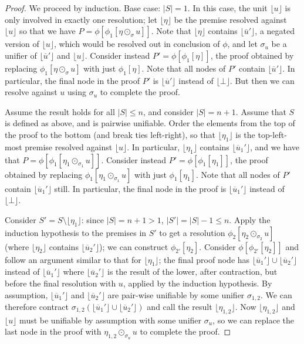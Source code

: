 \documentclass[12pt]{article}
\theoremstyle{definition}
\theoremstyle{remark}
\newcommand{\clause}[1]{ \lfloor{#1} \rfloor}
\begin{document}
\begin{proof}
We proceed by induction. Base case: $|S|=1$. In this case, the unit $\clause{u}$ is only involved in exactly one resolution; let $\clause{\eta}$ be the premise resolved against $\clause{u}$ so that we have $P=\phi[\phi_1[\eta \odot_{\sigma} u]]$. Note that $\clause{\eta}$ contains $\clause{\overline{u}'}$, a negated version of $\clause{u}$, which would be resolved out in conclusion of $\phi$, and let $\sigma_u$ be a unifier of $\clause{\overline{u}'}$ and $\clause{u}$. Consider instead $P'=\phi[\phi_1[\eta]]$, the proof obtained by replacing $\phi_1[\eta \odot_{\sigma} u]$ with just $\phi_1[\eta]$. Note that all nodes of $P'$ contain $\clause{\overline{u}'}$. In particular, the final node in the proof $P'$ is $\clause{\overline{u}'}$ instead of $\clause{\bot}$. But then we can resolve against $u$ using $\sigma_u$ to complete the proof.

Assume the result holds for all $|S|\le n$, and consider $|S|=n+1$. Assume that $S$ is defined as above, and is pairwise unifiable. Order the elements from the top of the proof to the bottom (and break ties left-right), so that $\clause{\eta_1}$ is the top-left-most premise resolved against $\clause{u}$. In particular, $\clause{\eta_1}$ contains $\clause{\overline{u}_1'}$, and we have that $P=\phi[\phi_1[\eta_1 \odot_{\sigma_1} u]]$. Consider instead $P'=\phi[\phi_{1}[\eta_1]]$, the proof obtained by replacing $\phi_1[\eta_1 \odot_{\sigma_1} u]$ with just $\phi_{1}[\eta_1]$. Note that all nodes of $P'$ contain $\clause{\overline{u}_1'}$ still. In particular, the final node in the proof is $\clause{\overline{u}_1'}$ instead of $\clause{\bot}$.  

Consider $S'=S\setminus\clause{\eta_1}$: since $|S|=n+1>1$, $|S'| = |S|-1 \le n$. Apply the induction hypothesis to the premises in $S'$ to get a  resolution $\phi_2[\eta_2 \odot_{\sigma_2} u]$ (where $\clause{\eta_2}$ contains $\clause{\overline{u}_2'}$);  we can construct $\phi_{2'}[\eta_2]$. Consider  $\phi[\phi_{2'}[\eta_2]]$ and follow an argument similar to that for $\clause{\eta_1}$; the final proof node has $\clause{\overline{u}_1'} \cup \clause{\overline{u}_2'}$ instead of $\clause{\overline{u}_1'}$ where $\clause{\overline{u}_2'}$ is the result of the lower, after contraction, but before the final resolution with $u$, applied by the induction hypothesis.  By assumption, $\clause{\overline{u}_1'}$ and $\clause{\overline{u}_2'}$ are pair-wise unifiable by some unifier $\sigma_{1,2}$. We can therefore contract $\sigma_{1,2}(\clause{\overline{u}_1'} \cup \clause{\overline{u}_2'})$ and call the result $\clause{\eta_{1,2}}$. Now $\clause{\eta_{1,2}}$ and $\clause{u}$ must be unifiable by assumption with some unifier $\sigma_u$, so we can replace the last node in the proof with $\eta_{1,2}\odot_{\sigma_u} u$ to complete the proof.
\end{proof}
\end{document}
